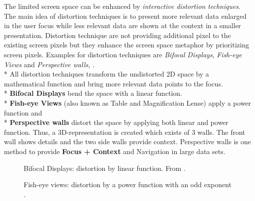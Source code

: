 The limited screen space can be enhanced by \textit{interactive distortion techniques}\cite{mackinlay1991perspective}.
The main idea of distortion techniques is to present more relevant data enlarged in the user focus while less relevant data are shown at the context in a smaller presentation. Distortion technique are not providing additional pixel to the existing screen pixels but they enhance the screen space metaphor by prioritizing screen pixels.
Examples for distortion techniques are \textit{Bifocal Displays}\cite{Spence1982}, \textit{Fish-eye Views} and \textit{Perspective walls\cite{Keim2005}, \cite{mackinlay1991perspective}}.\\*
All distortion techniques transform the undistorted 2D space by a mathematical function and bring more relevant data points to the focus.\\* 
\textbf{Bifocal Displays} bend the space with a linear function.\\*
\textbf{Fish-eye Views} (also known as Table and Magnification Lense) apply a power function and\\*
\textbf{Perspective walls} distort the space by applying both linear and power function. Thus, a 3D-representation is created which exists of 3 walls. The front wall shows details and the two side walls provide context. Perspective walls is one method to provide \textbf{Focus + Context} and Navigation in large data sets.
\begin{figure}[H]
    \centering
    \caption{Bifocal Displays: distortion by linear function. From \cite{Stroe1999}.}
    \label{fig:bifocal}
\end{figure}

\begin{figure}[H]
    \centering
    \caption{Fish-eye views:  distortion by a power function with an odd exponent \cite{Stroe1999}.}
    \label{fig:fisheye}
\end{figure}

